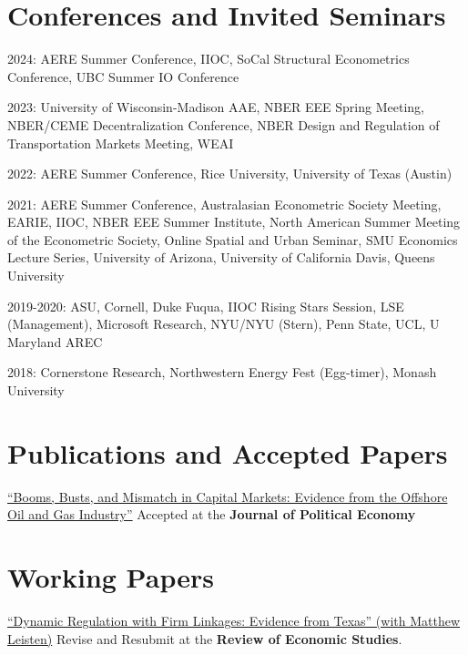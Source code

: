 \documentclass[margin,line]{res}
\newenvironment{list1}{
  \begin{list}{\ding{113}}{%
      \setlength{\itemsep}{.025in}
      \setlength{\parsep}{0in} \setlength{\parskip}{0in}
      \setlength{\topsep}{0in} \setlength{\partopsep}{0in}
      \setlength{\leftmargin}{0.17in}}}{\end{list}}
\begin{document}
\begin{resume}
\section{ Conferences and Invited Seminars}
\begin{list1}
\item[] 2024: AERE Summer Conference, IIOC, SoCal Structural Econometrics Conference, UBC Summer IO Conference
\item[] 2023: University of Wisconsin-Madison AAE, NBER EEE Spring Meeting, NBER/CEME Decentralization Conference, NBER Design and Regulation of Transportation Markets Meeting, WEAI
\item[] 2022: AERE Summer Conference, Rice University, University of Texas (Austin)
\item[] 2021: AERE Summer Conference, Australasian Econometric Society Meeting, EARIE, IIOC, NBER EEE Summer Institute, North American Summer Meeting of the Econometric Society, Online Spatial and Urban Seminar, SMU Economics Lecture Series, University of Arizona, University of California Davis, Queens University
\item[] 2019-2020: ASU, Cornell, Duke Fuqua, IIOC Rising Stars Session, LSE (Management), Microsoft Research, NYU/NYU (Stern), Penn State, UCL, U Maryland AREC
\item[] 2018:  Cornerstone Research, Northwestern Energy Fest (Egg-timer), Monash University
\end{list1}

\section{Publications and Accepted Papers}
\begin{list1}
\item[] \href{https://nvreug.github.io/paper/bbm.pdf}{``Booms, Busts, and Mismatch in Capital Markets: Evidence from the Offshore Oil and Gas Industry''} Accepted at the \textbf{Journal of Political Economy}
\end{list1}

\section{Working Papers}
\begin{list1}

\item[] \href{ https://www.dropbox.com/s/ceqvc55q4hxpi4b/Dynamic_Regulation_with_Firm_Linkages.pdf?dl=0}{``Dynamic Regulation with Firm Linkages: Evidence from Texas'' (with Matthew Leisten)} Revise and Resubmit at the \textbf{Review of Economic Studies}.


\end{list1}
\end{resume}
\end{document}
